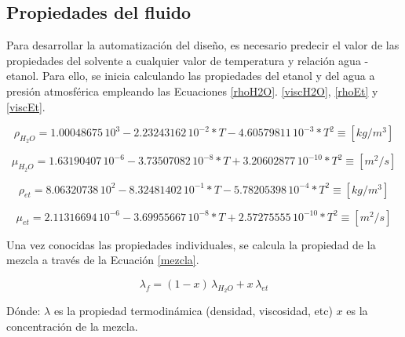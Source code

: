 \subsection{Propiedades del fluido}

\noindent
\justify

Para desarrollar la automatizaci\'on del dise\~no, es necesario predecir el valor de las propiedades del solvente a cualquier valor de temperatura y relaci\'on agua - etanol. Para ello, se inicia calculando las propiedades del etanol y del agua a presi\'on atmosf\'erica empleando las Ecuaciones \ref{rhoH2O}. \ref{viscH2O}, \ref{rhoEt} y \ref{viscEt}.

\begin{equation}
	\rho _{H_2O} = 1.00048675 \, 10^3 - 2.23243162 \, 10^{-2}*T - 4.60579811 \, 10^{-3}*T^2 \equiv \left[ kg / m^3 \right] 
	\label{rhoH2O}
\end{equation}

\begin{equation}
	\mu _{H_2O} = 1.63190407 \, 10^{-6} - 3.73507082 \, 10^{-8}*T + 3.20602877 \, 10^{-10}*T^2 \equiv \left[ m^2 / s \right] 
	\label{viscH2O}
\end{equation}


\begin{equation}
	\rho _{et} = 8.06320738 \, 10^{2}-8.32481402 \, 10^{-1}*T-5.78205398 \, 10^{-4}*T^2 \equiv \left[ kg / m^3 \right] 
	\label{rhoEt}
\end{equation}

\begin{equation}
	\mu _{et} = 2.11316694 \, 10^{-6} - 3.69955667 \, 10^{-8}*T + 2.57275555 \, 10^{-10}*T^2 \equiv \left[ m^2 / s \right] 
	\label{viscEt}
\end{equation}

\noindent
\justify

Una vez conocidas las propiedades individuales, se calcula la propiedad de la mezcla a trav\'es de la Ecuaci\'on \ref{mezcla}.

\begin{equation}
	\lambda _f = (1-x) \, \lambda _{H_2O} + x \, \lambda _{et}
	\label{mezcla}
\end{equation}

\noindent
\justify

D\'onde: $\lambda$ es la propiedad termodin\'amica (densidad, viscosidad, etc) $x$ es la concentraci\'on de la mezcla.